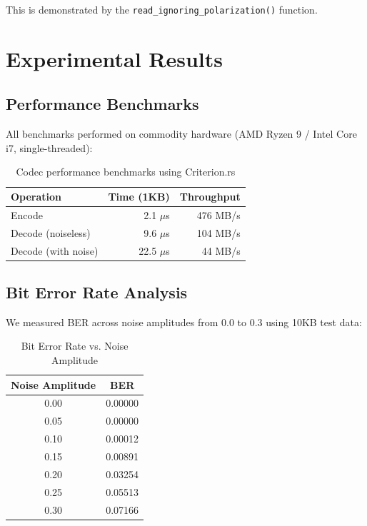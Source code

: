 \documentclass[11pt,a4paper]{article}
\begin{document}
This is demonstrated by the \texttt{read\_ignoring\_polarization()} function.

\section{Experimental Results}

\subsection{Performance Benchmarks}

All benchmarks performed on commodity hardware (AMD Ryzen 9 / Intel Core i7, single-threaded):

\begin{table}[h]
\centering
\begin{tabular}{lrr}
\toprule
\textbf{Operation} & \textbf{Time (1KB)} & \textbf{Throughput} \\
\midrule
Encode & 2.1 $\mu$s & 476 MB/s \\
Decode (noiseless) & 9.6 $\mu$s & 104 MB/s \\
Decode (with noise) & 22.5 $\mu$s & 44 MB/s \\
\bottomrule
\end{tabular}
\caption{Codec performance benchmarks using Criterion.rs}
\end{table}

\subsection{Bit Error Rate Analysis}

We measured BER across noise amplitudes from 0.0 to 0.3 using 10KB test data:

\begin{table}[h]
\centering
\begin{tabular}{cc}
\toprule
\textbf{Noise Amplitude} & \textbf{BER} \\
\midrule
0.00 & 0.00000 \\
0.05 & 0.00000 \\
0.10 & 0.00012 \\
0.15 & 0.00891 \\
0.20 & 0.03254 \\
0.25 & 0.05513 \\
0.30 & 0.07166 \\
\bottomrule
\end{tabular}
\caption{Bit Error Rate vs. Noise Amplitude}
\end{table}
\end{document}
